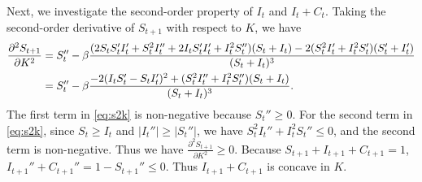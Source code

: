 \documentclass[nonblindrev, copyedit]{informs3a}
\newcounter{prop}[chapter]
\begin{document}
Next, we investigate the second-order property of $I_t$ and $I_{t}+C_{t}$.
Taking the second-order derivative of $S_{t+1}$ with respect to $K$, we have
\begin{align}
    \frac{\partial^2 S_{t+1}}{\partial K^2}&=S_{t}''-\beta\frac{(2S_{t}S_{t}'I_{t}'+S_{t}^2I_{t}''+2I_{t}S_{t}'I_{t}'+I_{t}^2S_{t}'')(S_{t}+I_{t})-2(S_{t}^2I_{t}'+I_{t}^2S_{t}')(S_{t}'+I_{t}')}{(S_{t}+I_{t})^3}\notag\\
    &=S_{t}''-\beta\frac{-2(I_{t}S_{t}'-S_{t}I_{t}')^2+(S_{t}^2I_{t}''+I_{t}^2S_{t}'')(S_{t}+I_{t})}{(S_{t}+I_{t})^3}.\label{eq:s2k}
\end{align}
The first term in \eqref{eq:s2k} is non-negative because $S_t''\ge0$. For the second term in \eqref{eq:s2k}, since $S_t\ge I_t$ and $|I_{t}''|\ge|S_{t}''|$, we have $S_{t}^2I_{t}''+I_{t}^2S_{t}''\le0$, and the second term is non-negative. Thus we have $\frac{\partial^2 S_{t+1}}{\partial K^2}\ge0$. Because $S_{t+1}+I_{t+1}+C_{t+1}=1$, $I_{t+1}''+C_{t+1}''=1-S_{t+1}''\le0$. Thus $I_{t+1}+C_{t+1}$ is concave in $K$.
\end{document}
